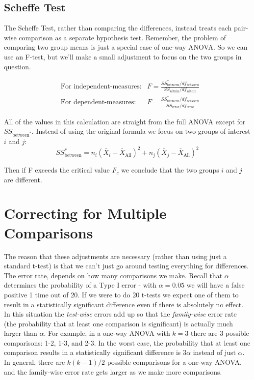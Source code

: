 \documentclass{tufte-handout}
\begin{document}
\begin{fullwidth}
\section{Scheffe Test}
The Scheffe Test, rather than comparing the differences, instead treats each pair-wise comparison as a separate hypothesis test. Remember, the problem of comparing two group means is just a special case of one-way ANOVA. So we can use an F-test, but we'll make a small adjustment to focus on the two groups in question.

\begin{align*}
&\text{For independent-measures:} &F=\frac{SS_{\text{between}}^* /df_{\text{between}}}{SS_{\text{within}}/df_{\text{within}}}\\
&\text{For dependent-measures:  } &F=\frac{SS_{\text{between}}^* /df_{\text{between}}}{SS_{\text{error}}/df_{\text{error}}}
\end{align*}

All of the values in this calculation are straight from the full ANOVA except for $SS_{\text{between}^*}$. Instead of using the original formula we focus on two groups of interest $i$ and $j$:  
\begin{equation*}
SS_{\text{between}}^* = n_i(\bar{X}_i-\bar{X}_{\text{All}})^2 + n_j(\bar{X}_j-\bar{X}_{\text{All}})^2
\end{equation*}

Then if F exceeds the critical value $F_c$ we conclude that the two groups $i$ and $j$ are different.

\end{fullwidth}
\section{Correcting for Multiple Comparisons}
The reason that these adjustments are necessary (rather than using just a standard t-test) is that we can't just go around testing everything for differences. The error rate, depends on how many comparisons we make. Recall that $\alpha$ determines the probability of a Type I error - with $\alpha=0.05$ we will have a false positive 1 time out of 20. If we were to do 20 t-tests we expect one of them to result in a statistically significant difference even if there is absolutely no effect. In this situation the \emph{test-wise} errors add up so that the \emph{family-wise} error rate (the probability that at least one comparison is significant) is actually much larger than $\alpha$. For example, in a one-way ANOVA with $k=3$ there are $3$ possible comparisons: 1-2, 1-3, and 2-3. In the worst case, the probability that at least one comparison results in a statistically significant difference is $3\alpha$ instead of just $\alpha$. In general, there are $k(k-1)/2$ possible comparisons for a one-way ANOVA, and the family-wise error rate gets larger as we make more comparisons.
\end{document}

